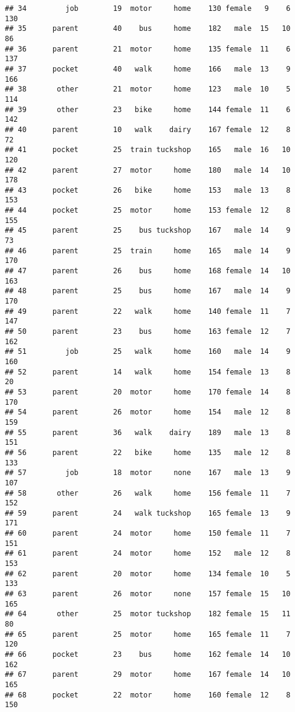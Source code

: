 \documentclass[
]{article}
\begin{document}
\begin{verbatim}
## 34         job        19  motor     home    130 female   9    6     130
## 35      parent        40    bus     home    182   male  15   10      86
## 36      parent        21  motor     home    135 female  11    6     137
## 37      pocket        40   walk     home    166   male  13    9     166
## 38       other        21  motor     home    123   male  10    5     114
## 39       other        23   bike     home    144 female  11    6     142
## 40      parent        10   walk    dairy    167 female  12    8      72
## 41      pocket        25  train tuckshop    165   male  16   10     120
## 42      parent        27  motor     home    180   male  14   10     178
## 43      pocket        26   bike     home    153   male  13    8     153
## 44      pocket        25  motor     home    153 female  12    8     155
## 45      parent        25    bus tuckshop    167   male  14    9      73
## 46      parent        25  train     home    165   male  14    9     170
## 47      parent        26    bus     home    168 female  14   10     163
## 48      parent        25    bus     home    167   male  14    9     170
## 49      parent        22   walk     home    140 female  11    7     147
## 50      parent        23    bus     home    163 female  12    7     162
## 51         job        25   walk     home    160   male  14    9     160
## 52      parent        14   walk     home    154 female  13    8      20
## 53      parent        20  motor     home    170 female  14    8     170
## 54      parent        26  motor     home    154   male  12    8     159
## 55      parent        36   walk    dairy    189   male  13    8     151
## 56      parent        22   bike     home    135   male  12    8     133
## 57         job        18  motor     none    167   male  13    9     107
## 58       other        26   walk     home    156 female  11    7     152
## 59      parent        24   walk tuckshop    165 female  13    9     171
## 60      parent        24  motor     home    150 female  11    7     151
## 61      parent        24  motor     home    152   male  12    8     153
## 62      parent        20  motor     home    134 female  10    5     133
## 63      parent        26  motor     none    157 female  15   10     165
## 64       other        25  motor tuckshop    182 female  15   11      80
## 65      parent        25  motor     home    165 female  11    7     120
## 66      pocket        23    bus     home    162 female  14   10     162
## 67      parent        29  motor     home    167 female  14   10     165
## 68      pocket        22  motor     home    160 female  12    8     150

\end{verbatim}
\end{document}
